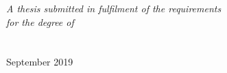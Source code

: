 \documentclass[11pt, oneside]{Thesis} %
\begin{document}
\begin{titlepage}
\begin{center}
\Large \textit{A thesis submitted in fulfilment of the requirements\\ for the degree of \degreename}\\[0.3cm] %
\groupname\\\deptname\\[1cm] %
 
{\Large September 2019}\\[2cm] %
 
\vfill
\end{center}

\end{titlepage}



\clearpage %

\iftrue
{} %

\clearpage %
\fi

\pagestyle{fancy} %

\tableofcontents %

\listoffigures %
\end{document}
